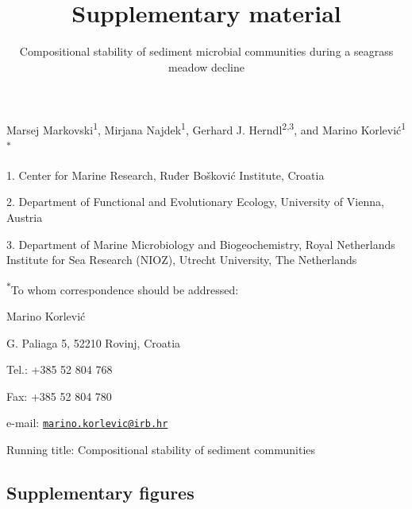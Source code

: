 \documentclass[12pt,]{article}
\title{\textbf{Supplementary material}}
\subtitle{Compositional stability of sediment microbial communities during a
seagrass meadow decline}
\author{}
\date{\vspace{-2.5em}}
\begin{document}
\maketitle

\vspace{10mm}

Marsej Markovski\textsuperscript{1}, Mirjana Najdek\textsuperscript{1},
Gerhard J. Herndl\textsuperscript{2,3}, and Marino
Korlević\textsuperscript{1\(*\)}

1. Center for Marine Research, Ruđer Bošković Institute, Croatia

2. Department of Functional and Evolutionary Ecology, University of
Vienna, Austria

3. Department of Marine Microbiology and Biogeochemistry, Royal
Netherlands Institute for Sea Research (NIOZ), Utrecht University, The
Netherlands

\textsuperscript{\(*\)}To whom correspondence should be addressed:

Marino Korlević

G. Paliaga 5, 52210 Rovinj, Croatia

Tel.: +385 52 804 768

Fax: +385 52 804 780

e-mail:
\href{mailto:marino.korlevic@irb.hr}{\nolinkurl{marino.korlevic@irb.hr}}

Running title: Compositional stability of sediment communities

\setlength\parindent{24pt}

\hypertarget{supplementary-figures}{%
\subsection{Supplementary figures}\label{supplementary-figures}}
\end{document}
